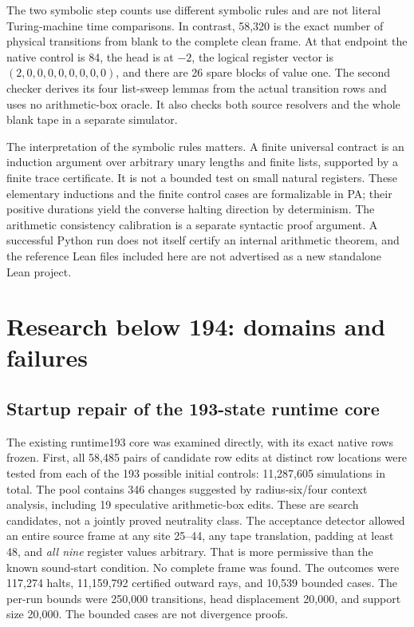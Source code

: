 \documentclass[11pt,letterpaper]{article}
\begin{document}
The two symbolic step counts use different symbolic rules and are not
literal Turing-machine time comparisons. In contrast, 58,320 is the exact
number of physical transitions from blank to the complete clean frame.
At that endpoint the native control is 84, the head is at $-2$, the logical
register vector is $(2,0,0,0,0,0,0,0,0)$, and there are 26 spare blocks of
value one. The second checker derives its four list-sweep lemmas from the
actual transition rows and uses no arithmetic-box oracle. It also checks
both source resolvers and the whole blank tape in a separate simulator.

The interpretation of the symbolic rules matters. A finite universal
contract is an induction argument over arbitrary unary lengths and finite
lists, supported by a finite trace certificate. It is not a bounded test
on small natural registers. These elementary inductions and the finite
control cases are formalizable in PA; their positive durations yield the
converse halting direction by determinism. The arithmetic consistency
calibration is a separate syntactic proof argument. A successful Python
run does not itself certify an internal arithmetic theorem, and the
reference Lean files included here are not advertised as a new standalone
Lean project.

\section{Research below 194: domains and failures}
\label{sec:search}

\subsection{Startup repair of the 193-state runtime core}

The existing runtime193 core was examined directly, with its exact native
rows frozen. First, all 58,485 pairs of candidate row edits at distinct row
locations were tested from each of the 193 possible initial controls:
11,287,605 simulations in total. The pool contains 346 changes suggested
by radius-six/four context analysis, including 19 speculative arithmetic-box
edits. These are search candidates, not a jointly proved neutrality class.
The acceptance detector allowed an entire source frame at any site 25--44,
any tape translation, padding at least 48, and \emph{all nine} register
values arbitrary. That is more permissive than the known sound-start
condition. No complete frame was found. The outcomes were
117,274 halts, 11,159,792 certified outward rays, and 10,539 bounded cases.
The per-run bounds were 250,000 transitions, head displacement 20,000,
and support size 20,000. The bounded cases are not divergence proofs.
\end{document}
